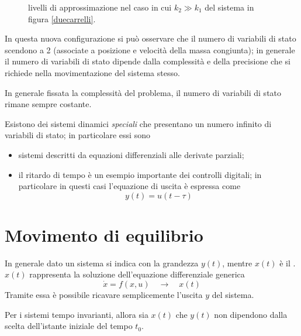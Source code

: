  	\begin{figure}[bht]
 		\centering
 		\begin{subfigure}{0.48\linewidth}
 			\centering
 			 \caption{}
 		\end{subfigure}
	 	\begin{subfigure}{0.48\linewidth}
		 	\centering
		 	 \caption{}
		 \end{subfigure}
	 	\caption{livelli di approssimazione nel caso in cui $k_2\gg k_1$ del sistema in figura \ref{duecarrelli}.}
	 	\label{fig:class:carrelliapprossimati}
 	\end{figure}
 	
 	In questa nuova configurazione si può osservare che il numero di variabili di stato scendono a 2  (associate a posizione e velocità della massa congiunta); in generale il numero di variabili di stato dipende dalla complessità e della precisione che si richiede nella movimentazione del sistema stesso.
 	
 	In generale fissata la complessità del problema, il numero di variabili di stato rimane sempre costante.
 	
 	\vspace{3mm} 
 	Esistono dei sistemi dinamici \textit{speciali} che presentano un numero infinito di variabili di stato; in particolare essi sono
 	\begin{itemize}
 		\item sistemi descritti da equazioni differenziali alle derivate parziali;
 		\item il ritardo di tempo è un esempio importante dei controlli digitali; in particolare in questi casi l'equazione di uscita è espressa come
 		\[y(t) = u(t-\tau)\]
 	\end{itemize}
 	
 	
 	
 	
\section{Movimento di equilibrio}
 	
 	
 	In generale dato un sistema si indica con  la grandezza $y(t)$, mentre $x(t)$ è il . $x(t)$ rappresenta la soluzione dell'equazione differenziale generica
 	\[ \dot x = f(x,u) \quad \rightarrow \quad x(t) \]
 	Tramite essa è possibile ricavare semplicemente l'uscita $y$ del sistema.
 	
 	\begin{nota}
 		Per i sistemi tempo invarianti, allora sia $x(t)$ che $y(t)$ non dipendono dalla scelta dell'istante iniziale del tempo $t_0$.
 	\end{nota}
 	
